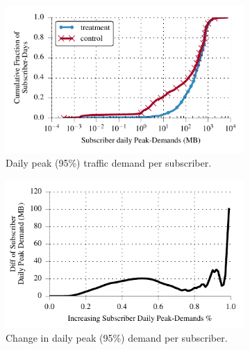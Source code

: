 \begin{figure}[t]
\begin{minipage}{\linewidth}
\centering
\begin{subfigure}[b]{.49\linewidth}
 \includegraphics[width=\linewidth]{figures/cdf_peak_demand-daily.pdf}
                \caption{Daily peak (95\%) traffic demand per subscriber.\label{fig:CDF-data-rate-daily-perc95}}
 \end{subfigure}
\begin{subfigure}[b]{.49\linewidth}
\includegraphics[width=\linewidth]{figures/diff_perc95_bytes_subsc-daily-overall_01.pdf}		%
                \caption{Change in daily peak (95\%) demand per subscriber.\label{fig:diff-peak-daily}} 
\end{subfigure}
%
\end{minipage}
  \caption{}
\end{figure}


